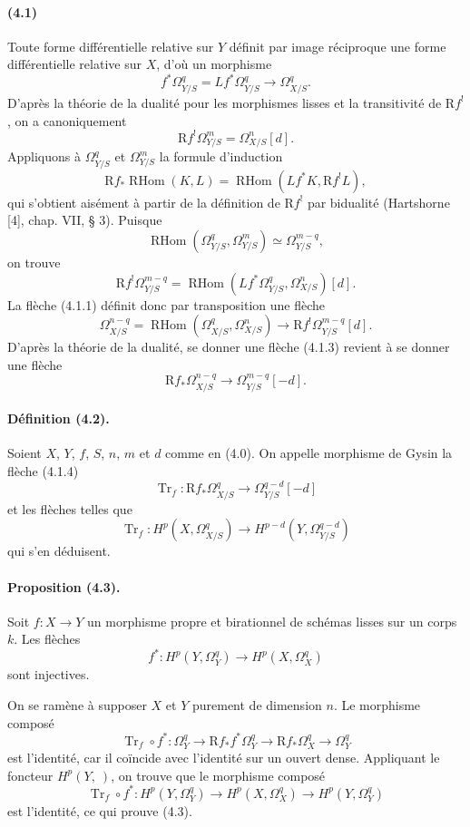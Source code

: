\documentclass[10pt]{article}
\newcommand{\R}{\mathrm R}
\providecommand{\Tr}{\operatorname{Tr}}
\providecommand{\RHom}{\operatorname{RHom}}
\begin{document}
\paragraph{(4.1)} Toute forme différentielle relative sur $Y$ définit par image réciproque une forme différentielle relative sur $X$, d'où un morphisme
\[
\tag{4.1.1}
f^*\Omega_{Y/S}^q=Lf^*\Omega_{Y/S}^q\longrightarrow\Omega_{X/S}^q.
\]
D'après la théorie de la dualité pour les morphismes lisses et la transitivité de $\R f^!$, on a canoniquement
\[
\tag{4.1.2}
\R f^!\Omega_{Y/S}^m=\Omega_{X/S}^n[d].
\]
Appliquons à $\Omega_{Y/S}^q$ et $\Omega_{Y/S}^m$ la formule d'induction
\[
\R f_*\RHom(K,L)=\RHom(Lf^*K,\R f^!L),
\]
qui s'obtient aisément à partir de la définition de $\R f^!$ par bidualité (Hartshorne [4], chap. VII, § 3). Puisque
\[
\RHom(\Omega_{Y/S}^q,\Omega_{Y/S}^m)\simeq\Omega_{Y/S}^{m-q},
\]
on trouve
\[
\R f^!\Omega_{Y/S}^{m-q}=\RHom(Lf^*\Omega_{Y/S}^q,\Omega_{X/S}^n)[d].
\]
La flèche (4.1.1) définit donc par transposition une flèche
\[
\tag{4.1.3}
\Omega_{X/S}^{n-q}=\RHom(\Omega_{X/S}^q,\Omega_{X/S}^n)
\longrightarrow \R f^!\Omega_{Y/S}^{m-q}[d].
\]
D'après la théorie de la dualité, se donner une flèche (4.1.3) revient à se donner une flèche
\[
\tag{4.1.4}
\R f_*\Omega_{X/S}^{n-q}\longrightarrow \Omega_{Y/S}^{m-q}[-d].
\]

\paragraph{Définition (4.2).} Soient $X$, $Y$, $f$, $S$, $n$, $m$ et $d$ comme en (4.0). On appelle morphisme de Gysin la flèche (4.1.4)
\[
\Tr_f:\R f_*\Omega_{X/S}^q\longrightarrow\Omega_{Y/S}^{q-d}[-d]
\]
et les flèches telles que
\[
\Tr_f:H^p(X,\Omega_{X/S}^q)\longrightarrow H^{p-d}(Y,\Omega_{Y/S}^{q-d})
\]
qui s'en déduisent.

\paragraph{Proposition (4.3).} Soit $f:X\to Y$ un morphisme propre et birationnel de schémas lisses sur un corps $k$. Les flèches
\[
f^*:H^p(Y,\Omega_Y^q)\longrightarrow H^p(X,\Omega_X^q)
\]
sont injectives.

On se ramène à supposer $X$ et $Y$ purement de dimension $n$. Le morphisme composé
\[
\Tr_f\circ f^*:\Omega_Y^q\longrightarrow\R f_*f^*\Omega_Y^q\longrightarrow\R f_*\Omega_X^q\longrightarrow\Omega_Y^q
\]
est l'identité, car il coïncide avec l'identité sur un ouvert dense. Appliquant le foncteur $H^p(Y,\ )$, on trouve que le morphisme composé
\[
\Tr_f\circ f^*:H^p(Y,\Omega_Y^q)\longrightarrow H^p(X,\Omega_X^q)\longrightarrow H^p(Y,\Omega_Y^q)
\]
est l'identité, ce qui prouve (4.3).
\end{document}
